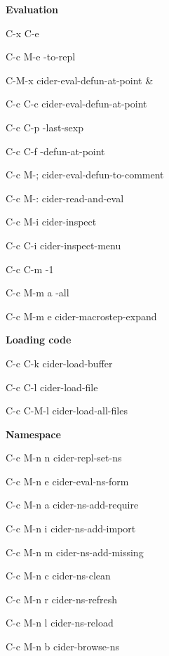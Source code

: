 \documentclass[a4paper,10pt]{article}
\renewcommand\section[1]{\bigskip\par\textbf{\large#1}\medskip}
\renewcommand\subsection[1]{\medskip\par\textbf{#1}\medskip}
\newcommand\keyify[1]{\keys{\ttfamily#1}}
\begin{document}
\begin{multicols}{2}
\subsection{Evaluation}
\begin{keylist}[labelwidth=\widthof{\keyify{C-c M-m a}}]
  \item[C-x C-e]   
  \item[C-c M-e]   \ns                     -to-repl
  \item[C-M-x]     cider-eval-defun-at-point
\&\item[C-c C-c]   cider-eval-defun-at-point
  \item[C-c C-p]   -last-sexp
  \item[C-c C-f]   \ns                   -defun-at-point
  \item[C-c M-;]   cider-eval-defun-to-comment
  \item[C-c M-:]   cider-read-and-eval
  \item[C-c M-i]   cider-inspect
  \item[C-c C-i]   cider-inspect-menu
  \item[C-c C-m]   -1
  \item[C-c M-m a] \ns                   -all
  \item[C-c M-m e] cider-macrostep-expand
\end{keylist}

\columnbreak

\subsection{Loading code}
\begin{keylist}[labelwidth=\widthof{\keyify{C-c C-M-l}}]
  \item[C-c C-k]   cider-load-buffer
  \item[C-c C-l]   cider-load-file
  \item[C-c C-M-l] cider-load-all-files
\end{keylist}

\section{Namespace}
\begin{keylist}[labelwidth=\widthof{\keyify{C-c M-n n}}]
  \item[C-c M-n n] cider-repl-set-ns
  \item[C-c M-n e] cider-eval-ns-form
  \item[C-c M-n a] cider-ns-add-require
  \item[C-c M-n i] cider-ns-add-import
  \item[C-c M-n m] cider-ns-add-missing
  \item[C-c M-n c] cider-ns-clean
  \item[C-c M-n r] cider-ns-refresh
  \item[C-c M-n l] cider-ns-reload
  \item[C-c M-n b] cider-browse-ns
\end{keylist}


\end{multicols}
\end{document}
